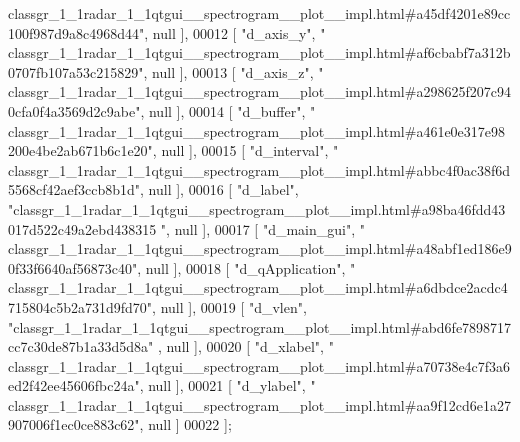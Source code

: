 \begin{DoxyCode}
{      classgr\_1\_1radar\_1\_1qtgui\_\_spectrogram\_\_plot\_\_impl.html#a45df4201e89cc100f987d9a8c4968d44"}, null ],
00012     [ \textcolor{stringliteral}{"d\_axis\_y"}, \textcolor{stringliteral}{"
      classgr\_1\_1radar\_1\_1qtgui\_\_spectrogram\_\_plot\_\_impl.html#af6cbabf7a312b0707fb107a53c215829"}, null ],
00013     [ \textcolor{stringliteral}{"d\_axis\_z"}, \textcolor{stringliteral}{"
      classgr\_1\_1radar\_1\_1qtgui\_\_spectrogram\_\_plot\_\_impl.html#a298625f207c940cfa0f4a3569d2c9abe"}, null ],
00014     [ \textcolor{stringliteral}{"d\_buffer"}, \textcolor{stringliteral}{"
      classgr\_1\_1radar\_1\_1qtgui\_\_spectrogram\_\_plot\_\_impl.html#a461e0e317e98200e4be2ab671b6c1e20"}, null ],
00015     [ \textcolor{stringliteral}{"d\_interval"}, \textcolor{stringliteral}{"
      classgr\_1\_1radar\_1\_1qtgui\_\_spectrogram\_\_plot\_\_impl.html#abbc4f0ac38f6d5568cf42aef3ccb8b1d"}, null ],
00016     [ \textcolor{stringliteral}{"d\_label"}, \textcolor{stringliteral}{"classgr\_1\_1radar\_1\_1qtgui\_\_spectrogram\_\_plot\_\_impl.html#a98ba46fdd43017d522c49a2ebd438315
      "}, null ],
00017     [ \textcolor{stringliteral}{"d\_main\_gui"}, \textcolor{stringliteral}{"
      classgr\_1\_1radar\_1\_1qtgui\_\_spectrogram\_\_plot\_\_impl.html#a48abf1ed186e90f33f6640af56873c40"}, null ],
00018     [ \textcolor{stringliteral}{"d\_qApplication"}, \textcolor{stringliteral}{"
      classgr\_1\_1radar\_1\_1qtgui\_\_spectrogram\_\_plot\_\_impl.html#a6dbdce2acdc4715804c5b2a731d9fd70"}, null ],
00019     [ \textcolor{stringliteral}{"d\_vlen"}, \textcolor{stringliteral}{"classgr\_1\_1radar\_1\_1qtgui\_\_spectrogram\_\_plot\_\_impl.html#abd6fe7898717cc7c30de87b1a33d5d8a"}
      , null ],
00020     [ \textcolor{stringliteral}{"d\_xlabel"}, \textcolor{stringliteral}{"
      classgr\_1\_1radar\_1\_1qtgui\_\_spectrogram\_\_plot\_\_impl.html#a70738e4c7f3a6ed2f42ee45606fbc24a"}, null ],
00021     [ \textcolor{stringliteral}{"d\_ylabel"}, \textcolor{stringliteral}{"
      classgr\_1\_1radar\_1\_1qtgui\_\_spectrogram\_\_plot\_\_impl.html#aa9f12cd6e1a27907006f1ec0ce883c62"}, null ]
00022 ];
\end{DoxyCode}
